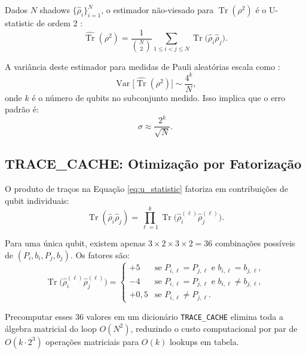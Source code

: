 \documentclass[12pt,a4paper,oneside]{book}
\theoremstyle{definition}
\theoremstyle{remark}
\DeclareMathOperator{\Tr}{Tr}
\DeclareMathOperator{\Var}{Var}
\begin{document}
Dados $N$ shadows $\{\hat{\rho}_i\}_{i=1}^N$, o estimador não-viesado para $\Tr(\rho^2)$ é o U-statistic de ordem 2 \cite{huang2020predicting}:
\begin{equation}\label{eq:u_statistic}
    \widehat{\Tr}(\rho^2) = \frac{1}{\binom{N}{2}} \sum_{1 \leq i < j \leq N} \Tr\bigl(\hat{\rho}_i \hat{\rho}_j\bigr).
\end{equation}

A variância deste estimador para medidas de Pauli aleatórias escala como \cite{huang2020predicting, elben2020cross}:
\begin{equation}\label{eq:variance_scaling}
    \Var\bigl[\widehat{\Tr}(\rho^2)\bigr] \sim \frac{4^k}{N},
\end{equation}
onde $k$ é o número de qubits no subconjunto medido. Isso implica que o erro padrão é:
\begin{equation}\label{eq:std_error}
    \sigma \approx \frac{2^k}{\sqrt{N}}.
\end{equation}

\subsection{TRACE\_CACHE: Otimização por Fatorização}

O produto de traços na Equação \eqref{eq:u_statistic} fatoriza em contribuições de qubit individuais:
\begin{equation}\label{eq:trace_factorization}
    \Tr(\hat{\rho}_i \hat{\rho}_j) = \prod_{\ell=1}^{k} \Tr\bigl(\hat{\rho}_i^{(\ell)} \hat{\rho}_j^{(\ell)}\bigr).
\end{equation}

Para uma única qubit, existem apenas $3 \times 2 \times 3 \times 2 = 36$ combinações possíveis de $(P_i, b_i, P_j, b_j)$. Os fatores são:
\begin{equation}\label{eq:trace_factors}
    \Tr\bigl(\hat{\rho}_i^{(\ell)} \hat{\rho}_j^{(\ell)}\bigr) =
    \begin{cases}
        +5 & \text{se } P_{i,\ell} = P_{j,\ell} \text{ e } b_{i,\ell} = b_{j,\ell}, \\
        -4 & \text{se } P_{i,\ell} = P_{j,\ell} \text{ e } b_{i,\ell} \neq b_{j,\ell}, \\
        +0{,}5 & \text{se } P_{i,\ell} \neq P_{j,\ell}.
    \end{cases}
\end{equation}

Precomputar esses 36 valores em um dicionário \texttt{TRACE\_CACHE} elimina toda a álgebra matricial do loop $O(N^2)$, reduzindo o custo computacional por par de $O(k \cdot 2^3)$ operações matriciais para $O(k)$ lookups em tabela.
\end{document}
